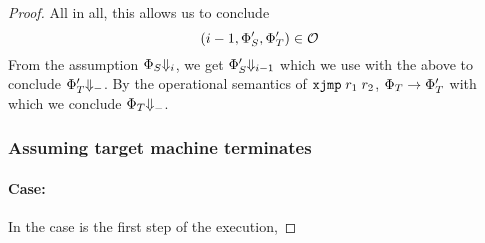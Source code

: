 \documentclass[a4paper]{article}
\begin{document}
\begin{proof}
All in all, this allows us to conclude
\[
  \npair[i-1]{\Phi_S',\Phi_T'} \in \lro
\]
From the assumption $\Phi_S\term[i]$, we get $\Phi'_S\term[i-1]$ which we use with the above to conclude $\Phi_T' \term$. By the operational semantics of $\txjmp{r_1}{r_2}$, $\Phi_T \step \Phi_T'$ with which we conclude $\Phi_T \term$.


\subsubsection*{Assuming target machine terminates}
\paragraph{Case: }
In the case  is the first step of the execution,


\end{proof}
\end{document}
